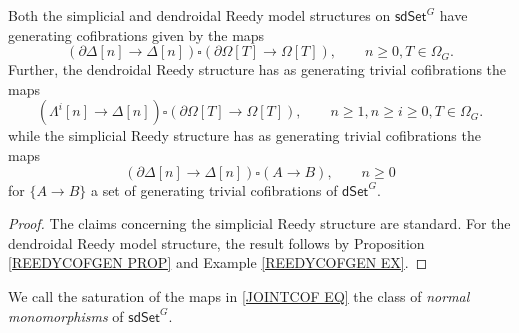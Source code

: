 \documentclass[a4paper,10pt
 ,draft
]{article}%
\begin{document}
\begin{proposition}
      \label{SDSETJRCOF PROP}
	Both the simplicial and dendroidal Reedy model structures on 
	$\mathsf{sdSet}^G$ have generating cofibrations given by the maps
\begin{equation}\label{JOINTCOF EQ}
	\left(\partial \Delta [n] \to \Delta[n]\right)
		\square
	\left(\partial \Omega[T] \to \Omega[T]\right),
	\qquad
	n\geq 0, T \in \Omega_G.
\end{equation}
  Further, the dendroidal Reedy structure has as generating trivial cofibrations the maps
\begin{equation}\label{DENDTRIVCOF EQ}
	\left(\Lambda^i [n] \to \Delta[n]\right)
		\square
	\left(\partial \Omega[T] \to \Omega[T]\right),
	\qquad
 	n\geq 1, n\geq i \geq 0, T \in \Omega_G.
\end{equation}
while the simplicial Reedy structure has as generating trivial cofibrations the maps
\begin{equation}\label{SIMPTRIVCOF EQ}
	\left(\partial \Delta [n] \to \Delta[n]\right)
		\square
	\left(A \to B\right),
	\qquad
	n\geq 0
\end{equation}
for $\{A \to B\}$ a set of generating trivial cofibrations of
$\mathsf{dSet}^G$.
\end{proposition}



\begin{proof}
The claims concerning the simplicial Reedy structure are standard. For the dendroidal Reedy model structure, the result follows by Proposition \ref{REEDYCOFGEN PROP} and Example \ref{REEDYCOFGEN EX}. 
%	
\end{proof}


We call the saturation of the maps in \eqref{JOINTCOF EQ} the class of \textit{normal monomorphisms} of $\mathsf{sdSet}^G$.
\end{document}
